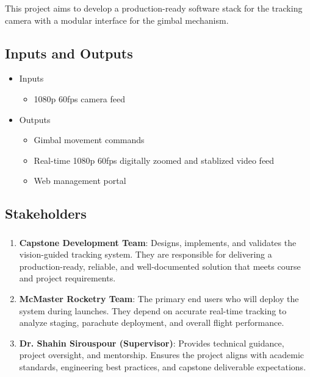 \documentclass{article}
\begin{document}
This project aims to develop a production-ready software stack for the tracking camera with a modular 
interface for the gimbal mechanism.

\subsection{Inputs and Outputs}


\begin{itemize}
    \item Inputs
    \begin{itemize}
        \item 1080p 60fps camera feed
    \end{itemize}
    \item Outputs
    \begin{itemize}
        \item Gimbal movement commands
        \item Real-time 1080p 60fps digitally zoomed and stablized video feed
        \item Web management portal
    \end{itemize}
\end{itemize}

\subsection{Stakeholders}

\subsubsection*{\color{blue}{Direct Stakeholders}}
\begin{enumerate}
    \item \textbf{Capstone Development Team}: Designs, implements, and validates the vision-guided tracking system. They are responsible for delivering a production-ready, reliable, and well-documented solution that meets course and project requirements.  

    \item \textbf{McMaster Rocketry Team}: The primary end users who will deploy the system during launches. They depend on accurate real-time tracking to analyze staging, parachute deployment, and overall flight performance.  

    \item \textbf{Dr. Shahin Sirouspour (Supervisor)}: Provides technical guidance, project oversight, and mentorship. Ensures the project aligns with academic standards, engineering best practices, and capstone deliverable expectations.  
\end{enumerate}
\end{document}
